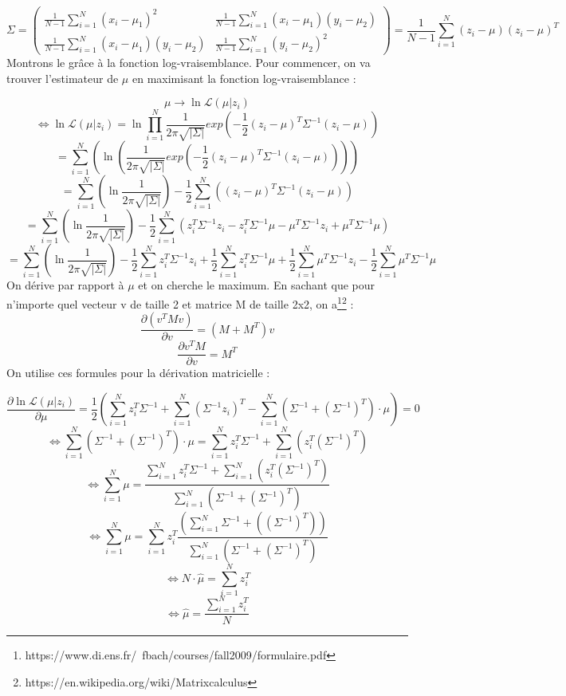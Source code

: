 \documentclass{article}
\begin{document}
\[
\Sigma = \begin{pmatrix}\frac{1}{N-1}\sum_{i=1}^{N}(x_i-\mu_1)^{2} & \frac{1}{N-1}\sum_{i=1}^{N}(x_i-\mu_1)(y_i-\mu_2) \\\frac{1}{N-1}\sum_{i=1}^{N}(x_i-\mu_1)(y_i-\mu_2) & \frac{1}{N-1}\sum_{i=1}^{N}(y_i-\mu_2)^{2}\end{pmatrix} = \frac{1}{N-1}\sum_{i=1}^{N}(z_i-\mu)(z_i-\mu)^{T}
\]
Montrons le grâce à la fonction log-vraisemblance. Pour commencer,
on va trouver l'estimateur de $\mu$ en maximisant la fonction log-vraisemblance :

$$\mu \rightarrow \ln \mathcal{L}(\mu | z_i)$$
$$\Leftrightarrow \ln \mathcal{L}(\mu | z_i)=\ln \prod_{i=1}^{N} \frac{1}{2\pi\sqrt{|\Sigma|}}exp(-\frac{1}{2}(z_i-\mu)^{T}\Sigma^{-1}(z_i-\mu))$$
$$= \sum_{i=1}^{N} (\ln (\frac{1}{2\pi\sqrt{|\Sigma|}}exp(-\frac{1}{2}(z_i-\mu)^{T}\Sigma^{-1}(z_i-\mu))))$$
$$= \sum_{i=1}^{N} (\ln \frac{1}{2\pi\sqrt{|\Sigma|}}) -\frac{1}{2}\sum_{i=1}^{N}((z_i-\mu)^{T}\Sigma^{-1}(z_i-\mu))$$
$$= \sum_{i=1}^{N} (\ln \frac{1}{2\pi\sqrt{|\Sigma|}}) -\frac{1}{2}\sum_{i=1}^{N}(z_i^{T}\Sigma^{-1}z_i - z_i^{T}\Sigma^{-1}\mu - \mu^{T}\Sigma^{-1}z_i + \mu^{T}\Sigma^{-1}\mu)$$
$$= \sum_{i=1}^{N} (\ln \frac{1}{2\pi\sqrt{|\Sigma|}}) -\frac{1}{2}\sum_{i=1}^{N}z_i^{T}\Sigma^{-1}z_i + \frac{1}{2}\sum_{i=1}^{N}z_i^{T}\Sigma^{-1}\mu + \frac{1}{2}\sum_{i=1}^{N}\mu^{T}\Sigma^{-1}z_i - \frac{1}{2}\sum_{i=1}^{N}\mu^{T}\Sigma^{-1}\mu$$
On dérive par rapport à $\mu$ et on cherche le maximum. En sachant que pour n'importe quel vecteur v de taille 2 et matrice M de taille 2x2, on a\footnote{https://www.di.ens.fr/~fbach/courses/fall2009/formulaire.pdf}\footnote{https://en.wikipedia.org/wiki/Matrixcalculus} : 
$$\frac{\partial (v^{T}Mv)}{\partial v} = (M+M^{T})v$$
$$\frac{\partial v^{T}M}{\partial v} = M^{T}$$
On utilise ces formules pour la dérivation matricielle :

$$\frac{\partial \ln \mathcal{L}(\mu | z_i)}{\partial \mu} = \frac{1}{2}(\sum_{i=1}^{N}z_i^{T}\Sigma^{-1}+\sum_{i=1}^{N}(\Sigma^{-1}z_i)^{T}-\sum_{i=1}^{N}(\Sigma^{-1}+(\Sigma^{-1})^{T})\cdot\mu) = 0$$
$$\Leftrightarrow \sum_{i=1}^{N}(\Sigma^{-1}+(\Sigma^{-1})^{T})\cdot\mu = \sum_{i=1}^{N}z_i^{T}\Sigma^{-1}+\sum_{i=1}^{N}(z_i^{T}(\Sigma^{-1})^{T})$$
$$\Leftrightarrow \sum_{i=1}^{N}\mu = \frac{\sum_{i=1}^{N}z_i^{T}\Sigma^{-1}+\sum_{i=1}^{N}(z_i^{T}(\Sigma^{-1})^{T})}{\sum_{i=1}^{N}(\Sigma^{-1}+(\Sigma^{-1})^{T})}$$
$$\Leftrightarrow \sum_{i=1}^{N}\mu = \sum_{i=1}^{N}z_i^{T}\frac{(\sum_{i=1}^{N}\Sigma^{-1}+((\Sigma^{-1})^{T}))}{\sum_{i=1}^{N}(\Sigma^{-1}+(\Sigma^{-1})^{T})}$$
$$\Leftrightarrow N\cdot\hat{\mu} = \sum_{i=1}^{N}z_i^{T}$$
$$\Leftrightarrow \hat{\mu} = \frac{\sum_{i=1}^{N}z_i^{T}}{N}$$
\end{document}
